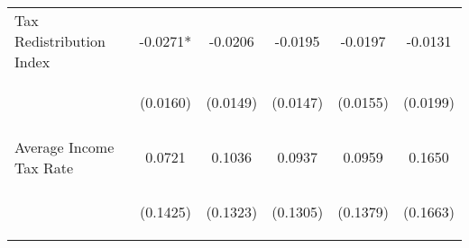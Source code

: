 \begin{center}
\begin{tabular}{lccccc}
\noalign{\smallskip}Tax Redistribution Index & \begin{scriptsize}-0.0271*\end{scriptsize} & \begin{scriptsize}-0.0206\end{scriptsize} & \begin{scriptsize}-0.0195\end{scriptsize} & \begin{scriptsize}-0.0197\end{scriptsize} & \begin{scriptsize}-0.0131\end{scriptsize}\\
 & \begin{scriptsize}(0.0160)\end{scriptsize} & \begin{scriptsize}(0.0149)\end{scriptsize} & \begin{scriptsize}(0.0147)\end{scriptsize} & \begin{scriptsize}(0.0155)\end{scriptsize} & \begin{scriptsize}(0.0199)\end{scriptsize}\\
\noalign{\smallskip}Average Income Tax Rate & \begin{scriptsize}0.0721\end{scriptsize} & \begin{scriptsize}0.1036\end{scriptsize} & \begin{scriptsize}0.0937\end{scriptsize} & \begin{scriptsize}0.0959\end{scriptsize} & \begin{scriptsize}0.1650\end{scriptsize}\\
 & \begin{scriptsize}(0.1425)\end{scriptsize} & \begin{scriptsize}(0.1323)\end{scriptsize} & \begin{scriptsize}(0.1305)\end{scriptsize} & \begin{scriptsize}(0.1379)\end{scriptsize} & \begin{scriptsize}(0.1663)\end{scriptsize}\\

\end{tabular}
\end{center}
